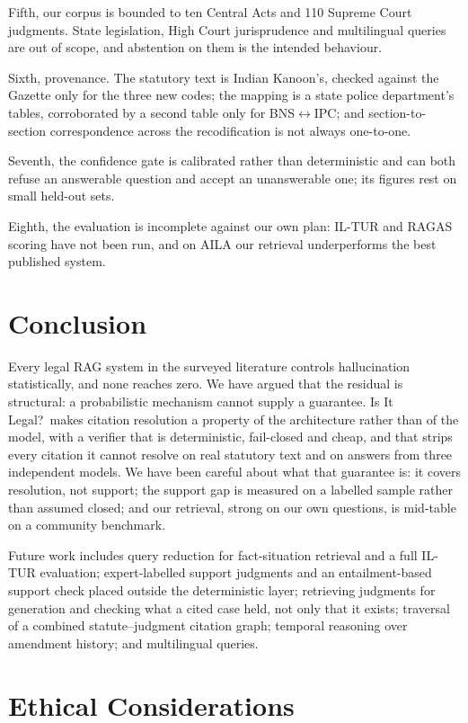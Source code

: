 \documentclass[conference]{IEEEtran}
\begin{document}
Fifth, our corpus is bounded to ten Central Acts and 110 Supreme Court judgments. State legislation, High Court jurisprudence and multilingual queries are out of scope, and abstention on them is the intended behaviour.

Sixth, provenance. The statutory text is Indian Kanoon's, checked against the Gazette only for the three new codes; the mapping is a state police department's tables, corroborated by a second table only for BNS$\leftrightarrow$IPC; and section-to-section correspondence across the recodification is not always one-to-one.

Seventh, the confidence gate is calibrated rather than deterministic and can both refuse an answerable question and accept an unanswerable one; its figures rest on small held-out sets.

Eighth, the evaluation is incomplete against our own plan: IL-TUR and RAGAS scoring have not been run, and on AILA our retrieval underperforms the best published system.

\section{Conclusion}

Every legal RAG system in the surveyed literature controls hallucination statistically, and none reaches zero. We have argued that the residual is structural: a probabilistic mechanism cannot supply a guarantee. Is It Legal?\ makes citation resolution a property of the architecture rather than of the model, with a verifier that is deterministic, fail-closed and cheap, and that strips every citation it cannot resolve on real statutory text and on answers from three independent models. We have been careful about what that guarantee is: it covers resolution, not support; the support gap is measured on a labelled sample rather than assumed closed; and our retrieval, strong on our own questions, is mid-table on a community benchmark.

Future work includes query reduction for fact-situation retrieval and a full IL-TUR evaluation; expert-labelled support judgments and an entailment-based support check placed outside the deterministic layer; retrieving judgments for generation and checking what a cited case held, not only that it exists; traversal of a combined statute--judgment citation graph; temporal reasoning over amendment history; and multilingual queries.

\section*{Ethical Considerations}
\end{document}

